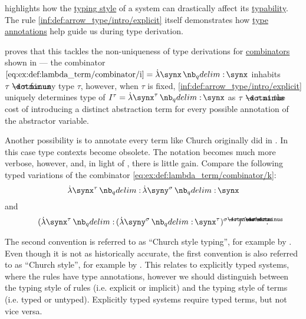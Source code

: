 \begin{remark}\label{rem:typing_style}
   highlights how the \hyperref[def:simple_type_system_style]{typing style} of a system can drastically affect its \hyperref[def:typability]{typability}. The rule \ref{inf:def:arrow_type/intro/explicit} itself demonstrates how \hyperref[con:type_annotation]{type annotations} help guide us during type derivation.

   proves that this tackles the non-uniqueness of type derivations for \hyperref[def:lambda_combinator]{combinators} shown in  --- the combinator \( \ref{eq:ex:def:lambda_term/combinator/i} = \qabs \synx \synx \) inhabits \( \tau \synimplies \tau \) for any type \( \tau \), however, when \( \tau \) is fixed, \ref{inf:def:arrow_type/intro/explicit} uniquely determines  type of \( I^\tau = \qabs {\synx^\tau} \synx \) as \( \tau \synimplies \tau \) at the cost of introducing a distinct abstraction term for every possible annotation of the abstractor variable.

  Another possibility is to annotate every term like Church originally did in \cite{Church1940STT}. In this case type contexts become obsolete. The notation becomes much more verbose, however, and, in light of , there is little gain. Compare the following typed variations of the combinator \ref{eq:ex:def:lambda_term/combinator/k}:
  \begin{equation*}
    \qabs {\synx^\tau} \qabs {\syny^\sigma} \synx
  \end{equation*}
  and
  \begin{equation*}
    (\qabs {\synx^\tau} (\qabs {\syny^\sigma} \synx^\tau)^{\sigma \synimplies \tau})^{\tau \synimplies \sigma \synimplies \tau}.
  \end{equation*}

  The second convention is referred to as \enquote{Church style typing}, for example by \cite[ch. 5]{Hindley1997BasicSTT}. Even though it is not as historically accurate, the first convention is also referred to as \enquote{Church style}, for example by . This relates to explicitly typed systems, where the rules have type annotations, however we should distinguish between the typing style of rules (i.e. explicit or implicit) and the typing style of terms (i.e. typed or untyped). Explicitly typed systems require typed terms, but not vice versa.


\end{remark}
